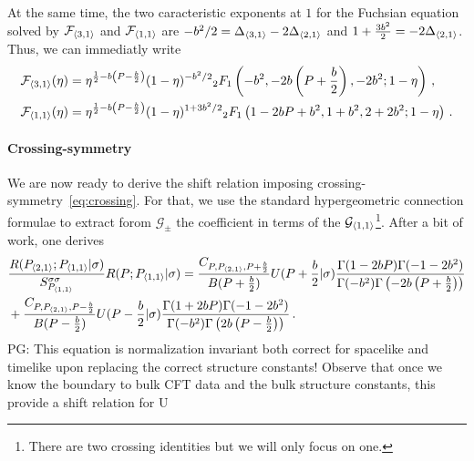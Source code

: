 \documentclass[a4paper]{article}
\newcommand{\purple}[1]{{\color{purple} #1 \color{black}}}
\newcommand{\PG}[1]{{\purple{PG: #1}}} %
\begin{document}
At the same time, the two caracteristic exponents at $1$ for the Fuchsian equation solved by $\mathcal{F}_{\braket{3,1}}$ and $\mathcal{F}_{\braket{1,1}}$ are $-b^2/2 = \Delta_{\braket{3,1}}-2\Delta_{\braket{2,1}}$ and $1+\frac{3b^2}{2} = -2\Delta_{\braket{2,1}}$. Thus, we can immediatly write
\begin{equation}
  \begin{aligned}
    \mathcal{F}_{\braket{3,1}}(\eta) &= \eta^{\frac{1}{2}-b\left(P-\frac{b}{2}\right)}(1-\eta)^{-b^2/2} {}_2 F_1\left(-b^2,-2b\left(P+\frac{b}{2}\right),-2b^2;1-\eta\right)\,,\\
    \mathcal{F}_{\braket{1,1}}(\eta) &= \eta^{\frac{1}{2}-b\left(P-\frac{b}{2}\right)}(1-\eta)^{1+3b^2/2} {}_2 F_1\left(1-2bP+b^2,1+b^2,2+2b^2;1-\eta\right)\,.
  \end{aligned}
\end{equation}

\paragraph{Crossing-symmetry}
We are now ready to derive the shift relation imposing crossing-symmetry~\eqref{eq:crossing}. For that, we use the standard hypergeometric connection formulae to extract forom $\mathcal{G}_{\pm}$ the coefficient in terms of the $\mathcal{G}_{\braket{1,1}}$\footnote{There are two crossing identities but we will only focus on one.}.
After a bit of work, one derives
\begin{equation}\label{eq:general_shift_relation}
  \begin{aligned}
    &\frac{R(P_{\braket{2,1}};P_{\braket{1,1}}|\sigma)}{S_{P_{\braket{1,1}}}^{\sigma \sigma}}R(P;P_{\braket{1,1}}|\sigma) =\frac{C_{P,P_{\braket{2,1}},P+\frac{ b }{2}}}{B(P+\frac{b}{2})} U(P+\frac{b}{2}|\sigma)\frac{\Gamma(1-2bP)\Gamma(-1-2b^2)}{\Gamma(-b^2)\Gamma\left(-2b\left(P+\frac{b}{2}\right)\right)} \\
    &+ \frac{C_{P,P_{\braket{2,1}},P-\frac{ b }{2}}}{B(P-\frac{b}{2})} U(P-\frac{b}{2}|\sigma)\frac{\Gamma(1+2bP)\Gamma(-1-2b^2)}{\Gamma(-b^2)\Gamma\left(2b\left(P-\frac{b}{2}\right)\right)}\,.
  \end{aligned}
\end{equation}
\PG{This equation is normalization invariant both correct for spacelike and timelike upon replacing the correct structure constants! Observe that once we know the boundary to bulk CFT data and the bulk structure constants, this provide a shift relation for U}
\end{document}

